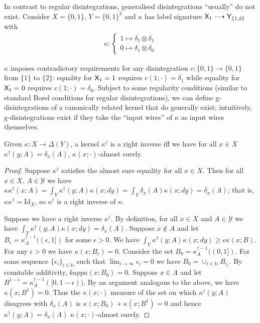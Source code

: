 
In contrast to regular disintegrations, generalised disintegrations ``usually'' do not exist. Consider $X=\{0,1\}$, $Y=\{0,1\}^2$ and $\kappa$ has label signature $\mathsf{X}_1\dashrightarrow \mathsf{Y}_{\{1,2\}}$ with
\begin{align}
	\kappa:\begin{cases} 1\mapsto \delta_1\otimes \delta_1\\
						 0\mapsto \delta_1\otimes \delta_0\end{cases}
\end{align}

$\kappa$ imposes contradictory requirements for any disintegration $c:\{0,1\}\to\{0,1\}$ from $\{1\}$ to $\{2\}$: equality for $\mathsf{X}_1=1$ requires $c(1;\cdot)=\delta_1$ while equality for $\mathsf{X}_1=0$ requires $c(1;\cdot) = \delta_0$. Subject to some regularity conditions (similar to standard Borel conditions for regular disintegrations), we can define g-disintegrations of a canonically related kernel that do generally exist; intuitively, g-disintegrations exist if they take the ``input wires'' of $\kappa$ as input wires themselves.

\begin{lemma}\label{lem:rightinverse}
Given $\kappa:X\to\Delta(Y)$, a kernel $\kappa^\dagger$ is a right inverse iff we have for all $x\in X$ $\kappa^\dagger(y;A)=\delta_x(A)$, $\kappa(x;\cdot)$-almost surely.
\end{lemma}

\begin{proof}
Suppose $\kappa^\dagger$ satisfies the almost sure equality for all $x\in X$. Then for all $x\in X$, $A\in \mathcal{Y}$ we have $\kappa \kappa^\dagger (x;A) = \int_Y \kappa^\dagger(y;A) \kappa(x;dy) = \int_Y \delta_x (A) \kappa(x;dy) = \delta_x(A)$; that is, $\kappa\kappa^\dagger = \mathrm{Id}_X$, so $\kappa^\dagger$ is a right inverse of $\kappa$.

Suppose we have a right inverse $\kappa^\dagger$. By definition, for all $x\in X$ and $A\in\mathcal{Y}$ we have $\int_Y \kappa^\dagger(y;A) \kappa(x;dy)=\delta_x(A)$. Suppose $x\not\in A$ and let $B_\epsilon=\kappa^{\dagger-1}_A((\epsilon,1])$ for some $\epsilon>0$. We have $\int_Y \kappa^\dagger(y;A) \kappa(x;dy)\geq\epsilon\kappa(x;B)$. For any $\epsilon>0$ we have $\kappa(x;B_\epsilon)=0$. Consider the set $B_0=\kappa^{\dagger-1}_A((0,1])$. For some sequence $\{\epsilon_i\}_{i\in \mathbb{N}}$ such that $\lim_{i\to\infty} \epsilon_i = 0$ we have $B_0=\cup_{i\in\mathbb{N}} B_{\epsilon_i}$. By countable additivity, $kappa(x;B_0)=0$. Suppose $x\in A$ and let $B^{1-\epsilon}=\kappa^{\dagger-1}_A([0,1-\epsilon))$. By an argument analogous to the above, we have $\kappa(x;B^1)=0$. Thus the $\kappa(x;\cdot)$ measure of the set on which $\kappa^\dagger(y;A)$ disagrees with $\delta_x(A)$ is $\kappa(x;B_0) + \kappa(x;B^1)=0$ and hence $\kappa^\dagger(y;A)=\delta_x(A)$ $\kappa(x;\cdot)$-almost surely.
\end{proof}

